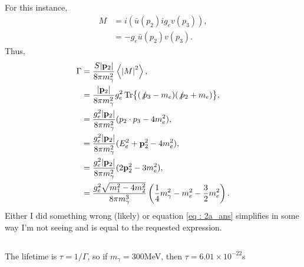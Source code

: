 \documentclass[
a4paper,
10pt,
twoside,
prd,
aps,
nofootinbib,
superscriptaddress,
floatfix,
preprintnumbers,
]{article}
\begin{document}
\subsection{}
For this instance,
\begin{align}
    M &= i(\bar{u}(p_2) ig_e v(p_3)),\\
    &=  -g_e \bar{u}(p_2) v(p_3).
\end{align}
Thus,
\begin{align}
    \Gamma &= \frac{S\abs{\vb{p}_2}}{8\pi m_\gamma^2} \ev{\abs{M}^2},\\
    &= \frac{\abs{\vb{p}_2}}{8\pi m_\gamma^2} g_e^2 \Tr{(\not p_3-m_e)(\not p_2+m_e)},\\
    &= \frac{g_e^2\abs{\vb{p}_2}}{8\pi m_\gamma^2} (p_2\cdot p_3 - 4m_e^2),\\
    &= \frac{g_e^2\abs{\vb{p}_2}}{8\pi m_\gamma^2} (E_e^2+\vb{p}_2^2 - 4m_e^2),\\
    &= \frac{g_e^2\abs{\vb{p}_2}}{8\pi m_\gamma^2} (2\vb{p}_2^2 - 3m_e^2),\\
    &= \frac{g_e^2\sqrt{m_1^2-4 m_2^2}}{8\pi m_\gamma^3} \left(\frac{1}{4}m_\gamma^2 - m_e^2 - \frac{3}{2}m_e^2\right).
    \label{eq : 2a_ans}
\end{align}
Either I did something wrong (likely) or equation \ref{eq : 2a_ans} simplifies in some way I'm not seeing and is equal to the requested expression.

\subsection{}

The lifetime is $\tau = 1/\Gamma$, so if $m_\gamma = 300$MeV, then $\tau = 6.01\times10^{-22}$s

\nocite{*}
\printbib

\stopmcols
\end{document}
